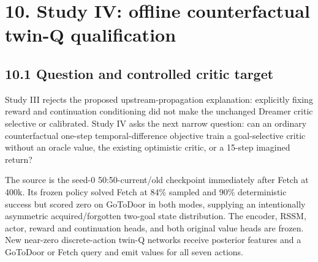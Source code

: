 \documentclass[10pt,a4paper]{article}
\newcommand{\reportsection}[1]{\section{#1}}
\newcommand{\reportsubsection}[1]{\subsection{\textcolor{brandblue}{#1}}}
\begin{document}
\clearpage
\reportsection{10. Study IV: offline counterfactual twin-Q qualification}
\reportsubsection{10.1 Question and controlled critic target}
Study III rejects the proposed upstream-propagation explanation: explicitly fixing reward and continuation conditioning did not make the unchanged Dreamer critic selective or calibrated. Study IV asks the next narrow question: can an ordinary counterfactual one-step temporal-difference objective train a goal-selective critic without an oracle value, the existing optimistic critic, or a 15-step imagined return?

The source is the seed-0 50:50-current/old checkpoint immediately after Fetch at 400k. Its frozen policy solved Fetch at 84\% sampled and 90\% deterministic success but scored zero on GoToDoor in both modes, supplying an intentionally asymmetric acquired/forgotten two-goal state distribution. The encoder, RSSM, actor, reward and continuation heads, and both original value heads are frozen. New near-zero discrete-action twin-Q networks receive posterior features and a GoToDoor or Fetch query and emit values for all seven actions.
\end{document}

